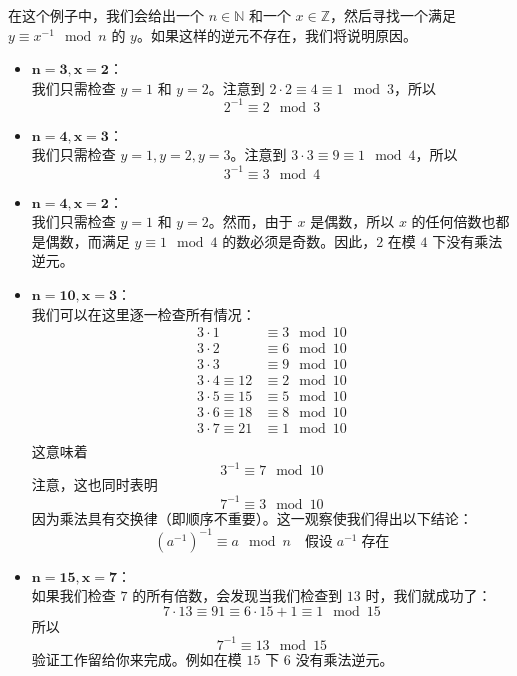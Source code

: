 \begin{example}
    在这个例子中，我们会给出一个 $n \in \mathbb{N}$ 和一个 $x \in \mathbb{Z}$，然后寻找一个满足 $y \equiv x^{-1} \mod n$ 的 $y$。如果这样的逆元不存在，我们将说明原因。
    \begin{itemize}
        \item $\mathbf{n=3, x=2}$：\\
            我们只需检查 $y = 1$ 和 $y = 2$。注意到 $2 \cdot 2 \equiv 4 \equiv 1 \mod 3$，所以
            \[2^{-1} \equiv 2 \mod 3\]
        \item $\mathbf{n=4, x=3}$：\\
            我们只需检查 $y = 1, y = 2, y = 3$。注意到 $3 \cdot 3 \equiv 9 \equiv 1 \mod 4$，所以
            \[3^{-1} \equiv 3 \mod 4\]
        \item $\mathbf{n=4, x=2}$：\\
            我们只需检查 $y = 1$ 和 $y = 2$。然而，由于 $x$ 是偶数，所以 $x$ 的任何倍数也都是偶数，而满足 $y \equiv 1 \mod 4$ 的数必须是奇数。因此，$2$ 在模 $4$ 下没有乘法逆元。
        \item $\mathbf{n=10, x=3}$：\\
            我们可以在这里逐一检查所有情况：
            \begin{align*}
                3 \cdot 1 &\equiv 3 \mod 10 \\
                3 \cdot 2 &\equiv 6 \mod 10 \\
                3 \cdot 3 &\equiv 9 \mod 10 \\
                3 \cdot 4 \equiv 12 &\equiv 2 \mod 10 \\
                3 \cdot 5 \equiv 15 &\equiv 5 \mod 10 \\
                3 \cdot 6 \equiv 18 &\equiv 8 \mod 10 \\
                3 \cdot 7 \equiv 21 &\equiv 1 \mod 10 \\
            \end{align*}
            这意味着
            \[3^{-1} \equiv 7 \mod 10\]
            注意，这也同时表明
            \[7^{-1} \equiv 3 \mod 10\]
            因为乘法具有交换律（即顺序不重要）。这一观察使我们得出以下结论：
            \[(a^{-1})^{-1} \equiv a \mod n \quad \text{假设}\; a^{-1} \;\text{存在}\]
        \item $\mathbf{n=15, x=7}$：\\
            如果我们检查 $7$ 的所有倍数，会发现当我们检查到 $13$ 时，我们就成功了：
            \[7 \cdot 13 \equiv 91 \equiv 6 \cdot 15 + 1 ≡ 1 \mod 15\]
            所以
            \[7^{-1} \equiv 13 \mod 15\]
            验证工作留给你来完成。例如在模 $15$ 下 $6$ 没有乘法逆元。 
    \end{itemize}
\end{example}

